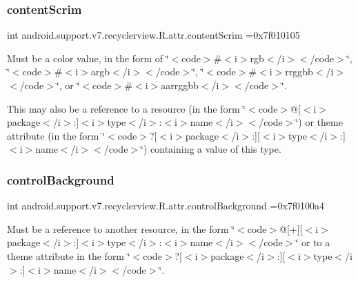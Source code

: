 \subsubsection{\texorpdfstring{content\+Scrim}{contentScrim}}
{\footnotesize\ttfamily int android.\+support.\+v7.\+recyclerview.\+R.\+attr.\+content\+Scrim =0x7f010105\hspace{0.3cm}{\ttfamily [static]}}

Must be a color value, in the form of \char`\"{}$<$code$>$\#$<$i$>$rgb$<$/i$>$$<$/code$>$\char`\"{}, \char`\"{}$<$code$>$\#$<$i$>$argb$<$/i$>$$<$/code$>$\char`\"{}, \char`\"{}$<$code$>$\#$<$i$>$rrggbb$<$/i$>$$<$/code$>$\char`\"{}, or \char`\"{}$<$code$>$\#$<$i$>$aarrggbb$<$/i$>$$<$/code$>$\char`\"{}. 

This may also be a reference to a resource (in the form \char`\"{}$<$code$>$@\mbox{[}$<$i$>$package$<$/i$>$\+:\mbox{]}$<$i$>$type$<$/i$>$\+:$<$i$>$name$<$/i$>$$<$/code$>$\char`\"{}) or theme attribute (in the form \char`\"{}$<$code$>$?\mbox{[}$<$i$>$package$<$/i$>$\+:\mbox{]}\mbox{[}$<$i$>$type$<$/i$>$\+:\mbox{]}$<$i$>$name$<$/i$>$$<$/code$>$\char`\"{}) containing a value of this type. \mbox{\label{classandroid_1_1support_1_1v7_1_1recyclerview_1_1R_1_1attr_a732ac653dc8ae1cdfa2a2439e2497fdc}} 
\subsubsection{\texorpdfstring{control\+Background}{controlBackground}}
{\footnotesize\ttfamily int android.\+support.\+v7.\+recyclerview.\+R.\+attr.\+control\+Background =0x7f0100a4\hspace{0.3cm}{\ttfamily [static]}}

Must be a reference to another resource, in the form \char`\"{}$<$code$>$@\mbox{[}+\mbox{]}\mbox{[}$<$i$>$package$<$/i$>$\+:\mbox{]}$<$i$>$type$<$/i$>$\+:$<$i$>$name$<$/i$>$$<$/code$>$\char`\"{} or to a theme attribute in the form \char`\"{}$<$code$>$?\mbox{[}$<$i$>$package$<$/i$>$\+:\mbox{]}\mbox{[}$<$i$>$type$<$/i$>$\+:\mbox{]}$<$i$>$name$<$/i$>$$<$/code$>$\char`\"{}. \mbox{\label{classandroid_1_1support_1_1v7_1_1recyclerview_1_1R_1_1attr_a673510ecde835bfedc453d79a5464b7b}} 
